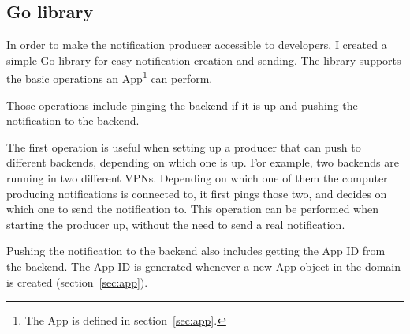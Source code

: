 \subsection{Go library}\label{sec:producer-go-library}

In order to make the notification producer
accessible to developers,
I created a simple Go library
for easy notification creation and sending.
The library supports the basic operations
an App\footnote{
  The App is defined in section~\ref{sec:app}.
} can perform.

Those operations include pinging the backend if it is up
and pushing the notification to the backend.

The first operation is useful when setting up
a producer that can push to different backends,
depending on which one is up.
For example,
two backends are running
in two different VPNs.
Depending on which one of them
the computer producing notifications
is connected to,
it first pings those two,
and decides on which one to send the notification to.
This operation can be performed
when starting the producer up,
without the need to send a real notification.

Pushing the notification to the backend
also includes getting the App ID from the backend.
The App ID is generated whenever
a new App object in the domain is created
(section~\ref{sec:app}).
